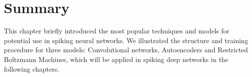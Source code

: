 
\section{Summary}
This chapter briefly introduced the most popular \DIFdelbegin {}\DIFdelend \DIFaddbegin {}\DIFaddend techniques and models for potential use in spiking neural networks.
We illustrated the structure and training procedure for three \DIFdelbegin {}\DIFdelend \DIFaddbegin {}\DIFaddend models: Convolutional networks, Autoencoders and Restricted Boltzmann Machines, which will be applied in spiking deep networks in the following chapters.